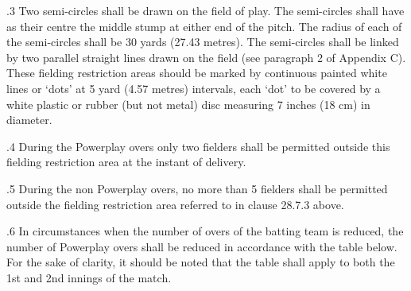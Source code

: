 \documentclass[12pt]{article}
\begin{document}
\vspace{\baselineskip}
\begin{adjustwidth}{0.5in}{0.03in}
{\fontsize{9pt}{10.8pt}.3 \tabto{0.49in} Two semi-circles shall be drawn on the field of play. The semi-circles shall have as their centre the middle stump at either end of the pitch. The radius of each of the semi-circles shall be 30 yards (27.43 metres). The semi-circles shall be linked by two parallel straight lines drawn on the field (see paragraph 2 of Appendix C). These fielding restriction areas should be marked by continuous painted white lines or ‘dots’ at 5 yard (4.57 metres) intervals, each ‘dot’ to be covered by a white plastic or rubber (but not metal) disc measuring 7 inches (18 cm) in diameter.\par}\par

\end{adjustwidth}


\vspace{\baselineskip}
\begin{adjustwidth}{0.5in}{0.21in}
{\fontsize{9pt}{10.8pt}.4 \tabto{0.49in} During the Powerplay overs only two fielders shall be permitted outside this fielding restriction area at the instant of delivery.\par}\par

\end{adjustwidth}


\vspace{\baselineskip}
\begin{adjustwidth}{0.5in}{0.19in}
{\fontsize{9pt}{10.8pt}.5 \tabto{0.49in} During the non Powerplay overs, no more than 5 fielders shall be permitted outside the fielding restriction area referred to in clause 28.7.3 above.\par}\par

\end{adjustwidth}


\vspace{\baselineskip}
\begin{adjustwidth}{0.5in}{0.07in}
\begin{justify}
{\fontsize{9pt}{10.8pt}.6 \tabto{0.49in} In circumstances when the number of overs of the batting team is reduced, the number of Powerplay overs shall be reduced in accordance with the table below. For the sake of clarity, it should be noted that the table shall apply to both the 1st and 2nd innings of the match.\par}
\end{justify}\par

\end{adjustwidth}
\end{document}
